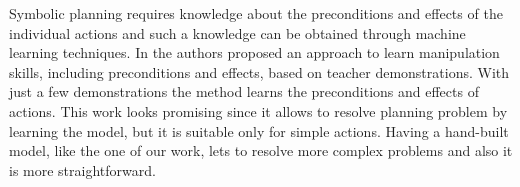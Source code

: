 Symbolic planning requires knowledge about the preconditions and effects of the individual actions and such a knowledge can be obtained through machine learning techniques.
In \citep{abdo2013learning} the authors proposed an
approach to learn manipulation skills, including preconditions
and effects, based on teacher demonstrations.
With just a few demonstrations the method learns the preconditions and effects of actions. %
This work looks promising since it allows to resolve planning problem by learning the model, but it is suitable only for simple actions. Having a hand-built model, like the one of our work, lets to resolve more complex problems and also it is more straightforward.

